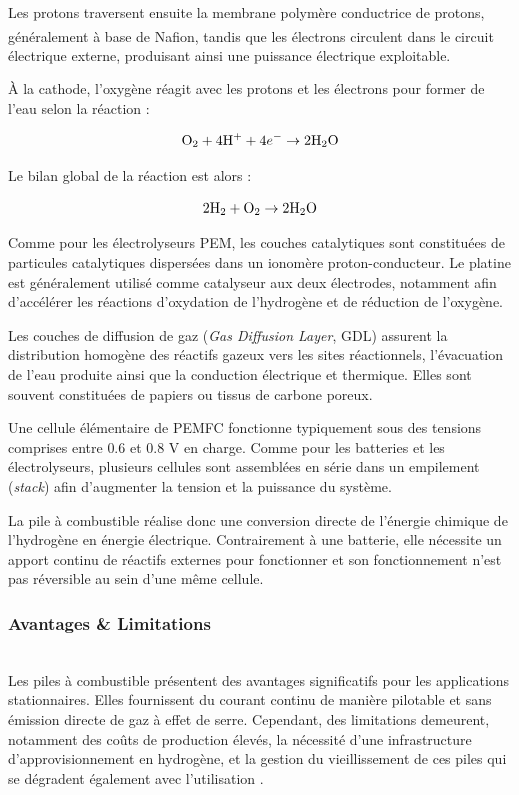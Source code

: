 Les protons traversent ensuite la membrane polymère conductrice de protons, généralement à base de Nafion\textsuperscript{\textregistered}, tandis que les électrons circulent dans le circuit électrique externe, produisant ainsi une puissance électrique exploitable.

À la cathode, l'oxygène réagit avec les protons et les électrons pour former de l'eau selon la réaction :

\begin{equation}
    \label{eq:cathode}
    \ce{O}_2 + 4\ce{H}^+ + 4e^- \rightarrow 2\ce{H}_2\ce{O}
\end{equation}

Le bilan global de la réaction est alors :

\begin{equation}
    \label{eq:globale}
    2\ce{H}_2 + \ce{O}_2 \rightarrow 2\ce{H}_2\ce{O}
\end{equation}

Comme pour les électrolyseurs PEM, les couches catalytiques sont constituées de particules catalytiques dispersées dans un ionomère proton-conducteur. Le platine est généralement utilisé comme catalyseur aux deux électrodes, notamment afin d'accélérer les réactions d'oxydation de l'hydrogène et de réduction de l'oxygène. 

Les couches de diffusion de gaz (\textit{Gas Diffusion Layer}, GDL) assurent la distribution homogène des réactifs gazeux vers les sites réactionnels, l'évacuation de l'eau produite ainsi que la conduction électrique et thermique. Elles sont souvent constituées de papiers ou tissus de carbone poreux.

Une cellule élémentaire de PEMFC fonctionne typiquement sous des tensions comprises entre \(0.6\) et \(0.8\) V en charge. Comme pour les batteries et les électrolyseurs, plusieurs cellules sont assemblées en série dans un empilement (\textit{stack}) afin d'augmenter la tension et la puissance du système.

La pile à combustible réalise donc une conversion directe de l'énergie chimique de l'hydrogène en énergie électrique. Contrairement à une batterie, elle nécessite un apport continu de réactifs externes pour fonctionner et son fonctionnement n'est pas réversible au sein d'une même cellule.

\subsubsection{Avantages \& Limitations}\hfill \\
Les piles à combustible présentent des avantages significatifs pour les applications stationnaires. Elles fournissent du courant continu de manière pilotable et sans émission directe de gaz à effet de serre. Cependant, des limitations demeurent, notamment des coûts de production élevés, la nécessité d'une infrastructure d'approvisionnement en hydrogène, et la gestion du vieillissement de ces piles qui se dégradent également avec l'utilisation \cite{dubau_review_2014}. 

